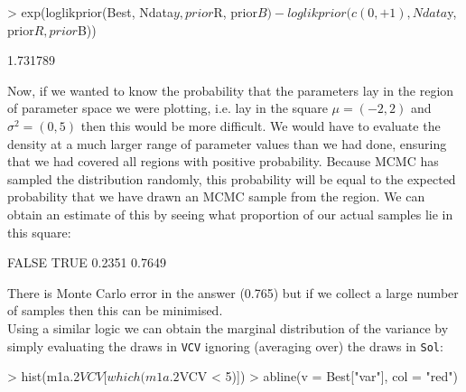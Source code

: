 \documentclass{article}
\begin{document}
\begin{Schunk}
\begin{Sinput}
> exp(loglikprior(Best, Ndata$y, prior$R, prior$B) - loglikprior(c(0, 
+     1), Ndata$y, prior$R, prior$B))
\end{Sinput}
\begin{Soutput}
[1] 1.731789
\end{Soutput}
\end{Schunk}


Now, if we wanted to know the probability that the parameters lay in the region of parameter space we were plotting, i.e. lay in the square $\mu = (-2,2)$ and $\sigma^{2} = (0,5)$ then this would be more difficult. We would have to evaluate the density at a much larger range of parameter values than we had done, ensuring that we had covered all regions with positive probability. Because MCMC has sampled the distribution randomly, this probability will be equal to the expected probability that we have drawn an MCMC sample from the region. We can obtain an estimate of this by seeing what proportion of our actual samples lie in this square:

\begin{Schunk}
\begin{Soutput}
 FALSE   TRUE 
0.2351 0.7649 
\end{Soutput}
\end{Schunk}

There is Monte Carlo error in the answer (0.765) but if we collect a large number of samples then this can be minimised.\\ 

Using a similar logic we can obtain the marginal distribution of the variance by simply evaluating the draws in \texttt{VCV} ignoring (averaging over) the draws in \texttt{Sol}:

\iftalk
\else
\begin{Schunk}
\begin{Sinput}
> hist(m1a.2$VCV[which(m1a.2$VCV < 5)])
> abline(v = Best["var"], col = "red")
\end{Sinput}
\end{Schunk}
\fi
\end{document}
